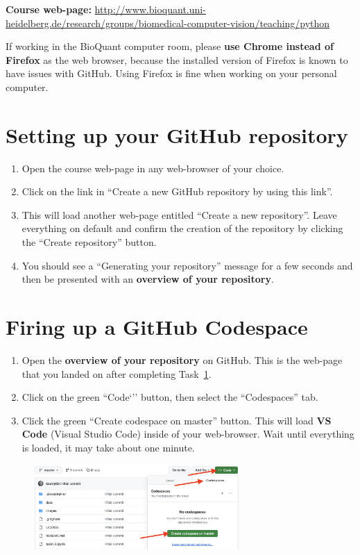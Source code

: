 \documentclass[12pt,a4paper]{article}
\begin{document}

\textbf{Course web-page:} \url{http://www.bioquant.uni-heidelberg.de/research/groups/biomedical-computer-vision/teaching/python}

\vspace{0.5em}
If working in the BioQuant computer room, please \textbf{use Chrome instead of Firefox} as the web browser, because the installed version of Firefox is known to have issues with GitHub. Using Firefox is fine when working on your personal computer.

\section{Setting up your GitHub repository}
\label{task:preparation}
\begin{enumerate}
\item Open the course web-page in any web-browser of your choice.
\item Click on the link in ``Create a new GitHub repository by using this link''.
\item This will load another web-page entitled ``Create a new repository''. Leave everything on default and confirm the creation of the repository by clicking the ``Create repository'' button.
\item You should see a ``Generating your repository'' message for a few seconds and then be presented with an \textbf{overview of your repository}.
\end{enumerate}

\section{Firing up a GitHub Codespace}
\label{task:codespaces}
\begin{enumerate}
\item Open the \textbf{overview of your repository} on GitHub. This is the web-page that you landed on after completing Task~\ref{task:preparation}.
\item Click on the green ``Code`'' button, then select the ``Codespaces'' tab.
\item Click the green ``Create codespace on master'' button. This will load \textbf{VS Code} (Visual Studio Code) inside of your web-browser. Wait until everything is loaded, it may take about one minute.
\end{enumerate}

\vspace{-1em}
\begin{figure}[h!]
    \centering
    \includegraphics[width=0.7\textwidth]{images/codespaces.png}
\end{figure}
\end{document}
